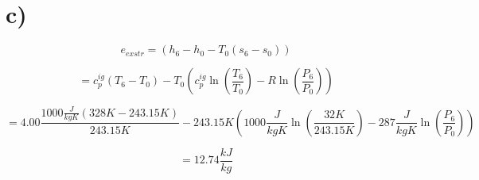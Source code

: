 

\section*{c)}

\[
e_{exstr} = (h_6 - h_0 - T_0(s_6 - s_0))
\]

\[
= c_p^{ig}(T_6 - T_0) - T_0 \left( c_p^{ig} \ln \left( \frac{T_6}{T_0} \right) - R \ln \left( \frac{P_6}{P_0} \right) \right)
\]

\[
= 4.00 \frac{1000 \frac{J}{kgK} (328K - 243.15K)}{243.15K} - 243.15K \left( 1000 \frac{J}{kgK} \ln \left( \frac{32K}{243.15K} \right) - 287 \frac{J}{kgK} \ln \left( \frac{P_6}{P_0} \right) \right)
\]

\[
= 12.74 \frac{kJ}{kg}
\]